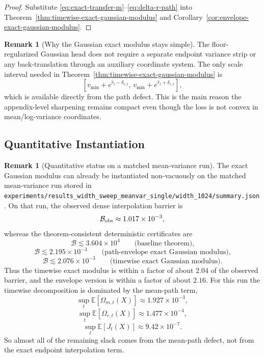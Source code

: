 \documentclass[11pt]{article}
\theoremstyle{definition}
\newtheorem{remark}[theorem]{Remark}
\newcommand{\E}{\mathbb{E}}
\newcommand{\cB}{\mathcal{B}}
\begin{document}
\begin{proof}
Substitute \eqref{eq:exact-transfer-m}--\eqref{eq:delta-r-path} into
Theorem~\ref{thm:timewise-exact-gaussian-modulus} and
Corollary~\ref{cor:envelope-exact-gaussian-modulus}.
\end{proof}

\begin{remark}[Why the Gaussian exact modulus stays simple]
\label{rem:gaussian-exact-modulus}
The floor-regularized Gaussian head does not require a separate endpoint variance
strip or any back-translation through an auxiliary coordinate system. The only
scale interval needed in
Theorem~\ref{thm:timewise-exact-gaussian-modulus} is
\[
  [v_{\min}+e^{\hat r_t-\delta_{r,t}},\,v_{\min}+e^{\hat r_t+\delta_{r,t}}],
\]
which is available directly from the path defect. This is the main reason
the appendix-level sharpening remains compact even though the loss is not
convex in mean/log-variance coordinates.
\end{remark}

\subsection{Quantitative Instantiation}

\begin{remark}[Quantitative status on a matched mean-variance run]
\label{rem:gaussian-quantitative-status}
The exact Gaussian modulus can already be instantiated non-vacuously on the matched
mean-variance run stored in
\texttt{experiments/results\_width\_sweep\_meanvar\_single/width\_1024/summary.json}.
On that run, the observed dense interpolation barrier is
\[
  \cB_{\rm obs}\approx 1.017\times 10^{-3},
\]
whereas the theorem-consistent deterministic certificates are
\[
  \cB \lesssim 3.604\times 10^{4}
  \qquad\text{(baseline theorem),}
\]
\[
  \cB \lesssim 2.195\times 10^{-3}
  \qquad\text{(path-envelope exact Gaussian modulus),}
\]
\[
  \cB \lesssim 2.076\times 10^{-3}
  \qquad\text{(timewise exact Gaussian modulus).}
\]
Thus the timewise exact modulus is within a factor of about $2.04$ of the
observed barrier, and the envelope version is within a factor of about $2.16$.
For this run the timewise decomposition is dominated by the mean-path term,
\[
  \sup_t \E[\Omega_{m,t}(X)]\approx 1.927\times 10^{-3},
\]
\[
  \sup_t \E[\Omega_{r,t}(X)]\approx 1.477\times 10^{-4},
\]
\[
  \sup_t \E[J_t(X)]\approx 9.42\times 10^{-7}.
\]
So almost all of the remaining slack comes from the mean-path defect, not from
the exact endpoint interpolation term.
\end{remark}
\end{document}
